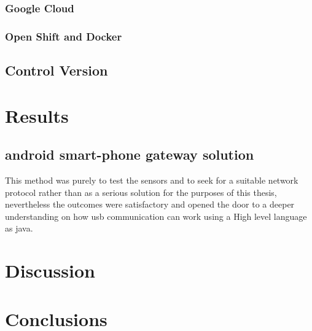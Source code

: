 \documentclass[hidelinks,11pt,a4paper,oneside,article]{memoir}
\numberwithin{equation}{chapter}
\begin{document}
\subsection{Google Cloud}
\subsection{Open Shift and Docker}

\section{Control Version}

\chapter{Results}
\section{android smart-phone gateway solution}
This method was purely to test the sensors and to seek for a suitable network protocol rather than as a serious solution for the purposes of this thesis, nevertheless the outcomes were satisfactory and opened the door to a deeper understanding on how \gls{usb} communication can work using a High level language as \gls{java}.



\chapter{Discussion}



\chapter{Conclusions}







\begin{flushleft}
\begin{singlespacing}

\end{singlespacing}
\end{flushleft}
\end{document}
